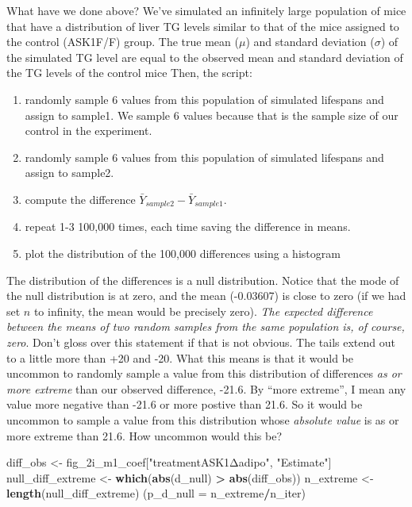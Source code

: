 \documentclass[]{book}
\newenvironment{Shaded}{\begin{snugshade}}{\end{snugshade}}
\newcommand{\DataTypeTok}[1]{\textcolor[rgb]{0.13,0.29,0.53}{#1}}
\newcommand{\KeywordTok}[1]{\textcolor[rgb]{0.13,0.29,0.53}{\textbf{#1}}}
\newcommand{\NormalTok}[1]{#1}
\newcommand{\OperatorTok}[1]{\textcolor[rgb]{0.81,0.36,0.00}{\textbf{#1}}}
\newcommand{\StringTok}[1]{\textcolor[rgb]{0.31,0.60,0.02}{#1}}
\providecommand{\tightlist}{%
  \setlength{\itemsep}{0pt}\setlength{\parskip}{0pt}}
\begin{document}
What have we done above? We've simulated an infinitely large population of mice that have a distribution of liver TG levels similar to that of the mice assigned to the control (ASK1F/F) group. The true mean (\(\mu\)) and standard deviation (\(\sigma\)) of the simulated TG level are equal to the observed mean and standard deviation of the TG levels of the control mice Then, the script:

\begin{enumerate}
\def\labelenumi{\arabic{enumi}.}
\tightlist
\item
  randomly sample 6 values from this population of simulated lifespans and assign to sample1. We sample 6 values because that is the sample size of our control in the experiment.
\item
  randomly sample 6 values from this population of simulated lifespans and assign to sample2.
\item
  compute the difference \(\bar{Y}_{sample2} - \bar{Y}_{sample1}\).
\item
  repeat 1-3 100,000 times, each time saving the difference in means.
\item
  plot the distribution of the 100,000 differences using a histogram
\end{enumerate}

The distribution of the differences is a null distribution. Notice that the mode of the null distribution is at zero, and the mean (-0.03607) is close to zero (if we had set \(n\) to infinity, the mean would be precisely zero). \emph{The expected difference between the means of two random samples from the same population is, of course, zero}. Don't gloss over this statement if that is not obvious. The tails extend out to a little more than +20 and -20. What this means is that it would be uncommon to randomly sample a value from this distribution of differences \emph{as or more extreme} than our observed difference, -21.6. By ``more extreme'', I mean any value more negative than -21.6 or more postive than 21.6. So it would be uncommon to sample a value from this distribution whose \emph{absolute value} is as or more extreme than 21.6. How uncommon would this be?

\begin{Shaded}
\begin{Highlighting}[]
\NormalTok{diff_obs <-}\StringTok{ }\NormalTok{fig_2i_m1_coef[}\StringTok{"treatmentASK1Δadipo"}\NormalTok{, }\StringTok{"Estimate"}\NormalTok{]}
\NormalTok{null_diff_extreme <-}\StringTok{ }\KeywordTok{which}\NormalTok{(}\KeywordTok{abs}\NormalTok{(d_null) }\OperatorTok{>}\StringTok{ }\KeywordTok{abs}\NormalTok{(diff_obs))}
\NormalTok{n_extreme <-}\StringTok{ }\KeywordTok{length}\NormalTok{(null_diff_extreme)}
\NormalTok{(}\DataTypeTok{p_d_null =}\NormalTok{ n_extreme}\OperatorTok{/}\NormalTok{n_iter)}
\end{Highlighting}
\end{Shaded}
\end{document}
